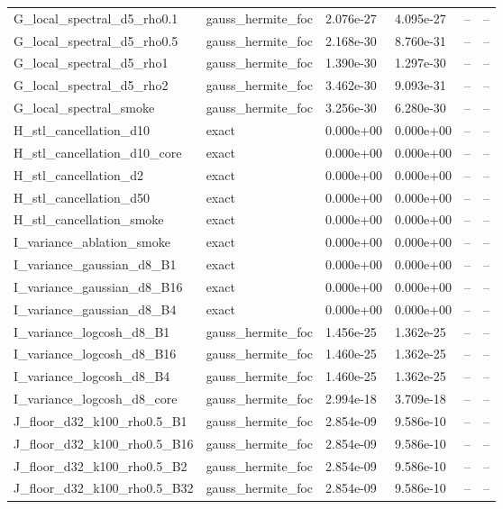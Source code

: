 \begin{tabular}{llllll}
G\_local\_spectral\_d5\_rho0.1 & gauss\_hermite\_foc & 2.076e-27 & 4.095e-27 & -- & -- \\
G\_local\_spectral\_d5\_rho0.5 & gauss\_hermite\_foc & 2.168e-30 & 8.760e-31 & -- & -- \\
G\_local\_spectral\_d5\_rho1 & gauss\_hermite\_foc & 1.390e-30 & 1.297e-30 & -- & -- \\
G\_local\_spectral\_d5\_rho2 & gauss\_hermite\_foc & 3.462e-30 & 9.093e-31 & -- & -- \\
G\_local\_spectral\_smoke & gauss\_hermite\_foc & 3.256e-30 & 6.280e-30 & -- & -- \\
H\_stl\_cancellation\_d10 & exact & 0.000e+00 & 0.000e+00 & -- & -- \\
H\_stl\_cancellation\_d10\_core & exact & 0.000e+00 & 0.000e+00 & -- & -- \\
H\_stl\_cancellation\_d2 & exact & 0.000e+00 & 0.000e+00 & -- & -- \\
H\_stl\_cancellation\_d50 & exact & 0.000e+00 & 0.000e+00 & -- & -- \\
H\_stl\_cancellation\_smoke & exact & 0.000e+00 & 0.000e+00 & -- & -- \\
I\_variance\_ablation\_smoke & exact & 0.000e+00 & 0.000e+00 & -- & -- \\
I\_variance\_gaussian\_d8\_B1 & exact & 0.000e+00 & 0.000e+00 & -- & -- \\
I\_variance\_gaussian\_d8\_B16 & exact & 0.000e+00 & 0.000e+00 & -- & -- \\
I\_variance\_gaussian\_d8\_B4 & exact & 0.000e+00 & 0.000e+00 & -- & -- \\
I\_variance\_logcosh\_d8\_B1 & gauss\_hermite\_foc & 1.456e-25 & 1.362e-25 & -- & -- \\
I\_variance\_logcosh\_d8\_B16 & gauss\_hermite\_foc & 1.460e-25 & 1.362e-25 & -- & -- \\
I\_variance\_logcosh\_d8\_B4 & gauss\_hermite\_foc & 1.460e-25 & 1.362e-25 & -- & -- \\
I\_variance\_logcosh\_d8\_core & gauss\_hermite\_foc & 2.994e-18 & 3.709e-18 & -- & -- \\
J\_floor\_d32\_k100\_rho0.5\_B1 & gauss\_hermite\_foc & 2.854e-09 & 9.586e-10 & -- & -- \\
J\_floor\_d32\_k100\_rho0.5\_B16 & gauss\_hermite\_foc & 2.854e-09 & 9.586e-10 & -- & -- \\
J\_floor\_d32\_k100\_rho0.5\_B2 & gauss\_hermite\_foc & 2.854e-09 & 9.586e-10 & -- & -- \\
J\_floor\_d32\_k100\_rho0.5\_B32 & gauss\_hermite\_foc & 2.854e-09 & 9.586e-10 & -- & -- \\

\end{tabular}
